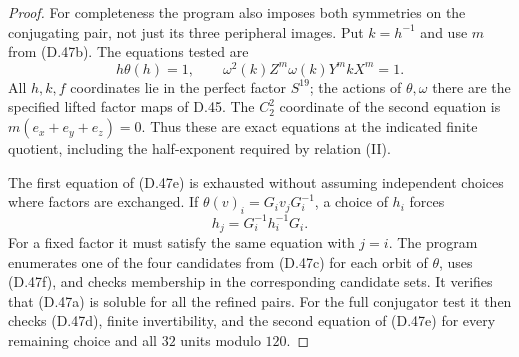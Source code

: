 \begin{proof}
For completeness the program also imposes both
symmetries on the conjugating pair, not just its
three peripheral images.
Put $k=h^{-1}$ and use $m$ from (D.47b).
The equations tested are
\[
       h\theta(h)=1,\qquad
       \omega^2(k)Z^m\omega(k)Y^m kX^m=1.
                                                        \tag{D.47e}
\]
All $h,k,f$ coordinates lie in the perfect factor
$S^{19}$; the actions of $\theta,\omega$ there
are the specified lifted factor maps of D.45.
The $C_2^2$ coordinate of the second equation is
$m(e_x+e_y+e_z)=0$.
Thus these are exact equations at the indicated
finite quotient, including the half-exponent
required by relation (II).

The first equation of (D.47e) is exhausted without
assuming independent choices where factors are
exchanged.  If
$\theta(v)_i=G_i v_jG_i^{-1}$, a choice of $h_i$
forces
\[
                       h_j=G_i^{-1}h_i^{-1}G_i.         \tag{D.47f}
\]
For a fixed factor it must satisfy the same equation
with $j=i$.  The program enumerates one of the
four candidates from (D.47c) for each orbit of
$\theta$, uses (D.47f), and checks membership in
the corresponding candidate sets.
It verifies that (D.47a) is soluble for all the
refined pairs.  For the full conjugator test it
then checks (D.47d), finite invertibility, and the
second equation of (D.47e) for every remaining
choice and all $32$ units modulo $120$.


\end{proof}
